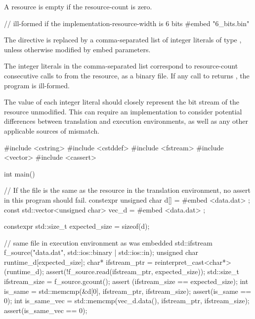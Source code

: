 A resource is empty if the resource-count is zero.

\pnum
\begin{example}
\begin{codeblock}
// ill-formed if the implementation-resource-width is 6 bits
#embed "6_bits.bin"
\end{codeblock}
\end{example}

\pnum
The  directive is replaced by a comma-separated list of integer
literals of type , unless otherwise modified by embed
parameters.

\pnum
The integer literals in the comma-separated list correspond to
resource-count consecutive calls to 
from the resource, as a binary file.
If any call to  returns , the program is
ill-formed.

\pnum
\recommended The value of each integer literal should closely represent
the bit stream of the resource unmodified.
This can require an implementation to consider potential differences between
translation and execution environments, as well as any other applicable
sources of mismatch.

\begin{example}
\begin{codeblock}
#include <cstring>
#include <cstddef>
#include <fstream>
#include <vector>
#include <cassert>

int main() {
  // If the file is the same as the resource in the translation environment, no assert in this program should fail.
  constexpr unsigned char d[] = {
#embed <data.dat>
  };
  const std::vector<unsigned char> vec_d = {
#embed <data.dat>
  };

  constexpr std::size_t expected_size = sizeof(d);

  // same file in execution environment as was embedded
  std::ifstream f_source("data.dat", std::ios::binary | std::ios::in);
  unsigned char runtime_d[expected_size];
  char* ifstream_ptr = reinterpret_cast<char*>(runtime_d);
  assert(!f_source.read(ifstream_ptr, expected_size));
  std::size_t ifstream_size = f_source.gcount();
  assert (ifstream_size == expected_size);
  int is_same = std::memcmp(&d[0], ifstream_ptr, ifstream_size);
  assert(is_same == 0);
  int is_same_vec = std::memcmp(vec_d.data(), ifstream_ptr, ifstream_size);
  assert(is_same_vec == 0);
}
\end{codeblock}
\end{example}

